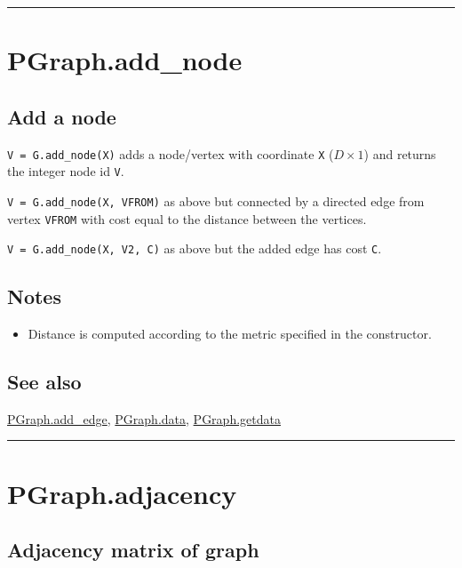 \vspace{1.5ex}\hrule

\hypertarget{PGraph.add\_node}{\section*{PGraph.add\_node}}
\subsection*{Add a node}


\texttt{V = G.add\_node(X)} adds a node/vertex with coordinate \texttt{X} ($D \times 1$) and
returns the integer node id \texttt{V}.



\texttt{V = G.add\_node(X, VFROM)} as above but connected by a directed edge from vertex \texttt{VFROM} with cost equal to the distance between the vertices.



\texttt{V = G.add\_node(X, V2, C)} as above but the added edge has cost \texttt{C}.


\subsection*{Notes}
\begin{itemize}
  \item Distance is computed according to the metric specified in the    constructor.
\end{itemize}

\subsection*{See also}


\hyperlink{PGraph.add_edge}{\color{blue} PGraph.add\_edge}, \hyperlink{PGraph.data}{\color{blue} PGraph.data}, \hyperlink{PGraph.getdata}{\color{blue} PGraph.getdata}

\vspace{1.5ex}\hrule

\hypertarget{PGraph.adjacency}{\section*{PGraph.adjacency}}
\subsection*{Adjacency matrix of graph}


